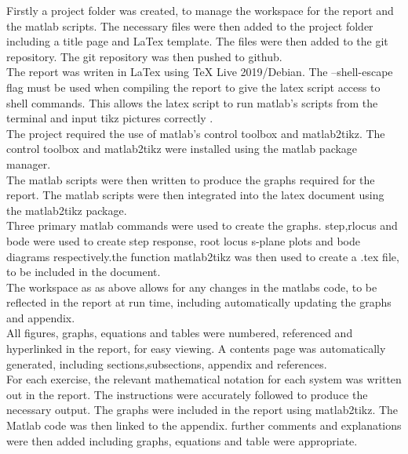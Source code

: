 \documentclass[12pt]{article}
\begin{document}
Firstly a project folder was created, to manage the workspace for the report and the matlab scripts. The necessary files were then added to the project folder including a title page and LaTex template. The files were then added to the git repository. The git repository was then pushed to github.\\

The report was writen in LaTex using TeX Live 2019/Debian. The --shell-escape flag must be used when compiling the report to give the latex script access to shell commands. This allows the latex script to run matlab's scripts from the terminal and input tikz pictures correctly .\\ 

The project required the use of matlab's control toolbox and matlab2tikz. The control toolbox and matlab2tikz were installed using the matlab package manager.\\

The matlab scripts were then written to produce the graphs required for the report. The matlab scripts were then integrated into the latex document using the matlab2tikz package.\\

Three primary matlab commands were used to create the graphs. step,rlocus and bode were used to create step response, root locus s-plane plots and bode diagrams respectively.the function matlab2tikz was then used to create a .tex file, to be included in the document.\\

The workspace as as above allows for any changes in the matlabs code, to be reflected in the report at run time, including automatically updating the graphs and appendix.\\

All figures, graphs, equations and tables were numbered, referenced and hyperlinked in the report, for easy viewing. A contents page was automatically generated, including sections,subsections, appendix and references.\\

For each exercise, the relevant mathematical notation for each system was written out in the report. The instructions were accurately followed to produce the necessary output. The graphs were included in the report using matlab2tikz. The Matlab code was then linked to the appendix. further comments and explanations were then added including graphs, equations and table were appropriate. \\
\end{document}
